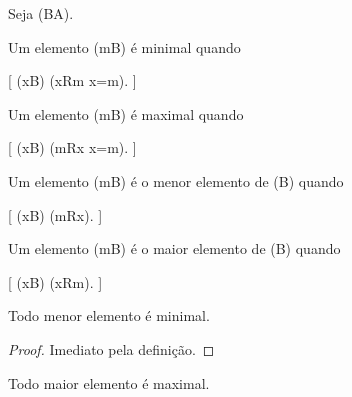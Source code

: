 \documentclass[../../main]{subfiles}
\begin{document}
\begin{defn}
	\label{def:matematica:relacoes:minimal}

	Seja (B\subseteq A).

	Um elemento (m\in B) é minimal quando

		[
			(\forall x\in B)
			(xRm \Rightarrow x=m).
		]

\end{defn}

\begin{defn}
	\label{def:matematica:relacoes:maximal}

	Um elemento (m\in B) é maximal quando

		[
			(\forall x\in B)
			(mRx \Rightarrow x=m).
		]

\end{defn}

\begin{defn}
	\label{def:matematica:relacoes:menor-elemento}

	Um elemento (m\in B) é o menor elemento de (B) quando

		[
			(\forall x\in B)
			(mRx).
		]

\end{defn}

\begin{defn}
	\label{def:matematica:relacoes:maior-elemento}

	Um elemento (m\in B) é o maior elemento de (B) quando

		[
			(\forall x\in B)
			(xRm).
		]

\end{defn}

\begin{prop}
	\label{prop:matematica:relacoes:menor-implica-minimal}

	Todo menor elemento é minimal.

\end{prop}

\begin{proof}

	Imediato pela definição.

\end{proof}

\begin{prop}
	\label{prop:matematica:relacoes:maior-implica-maximal}

	Todo maior elemento é maximal.

\end{prop}
\end{document}
